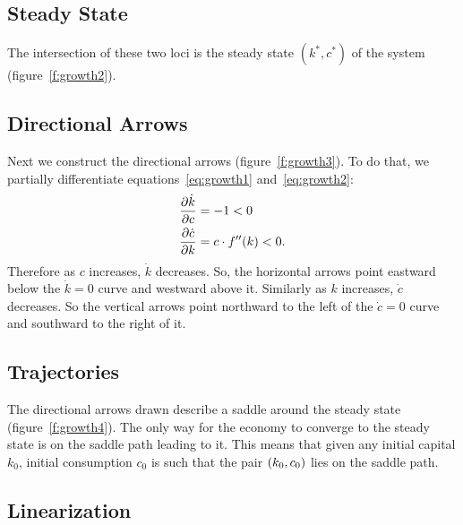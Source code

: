 \documentclass[letterpaper,12pt,leqno]{article}
\begin{document}
\subsection{Steady State}

The intersection of these two loci is the steady state $(k^{*},c^{*})$ of the system (figure~\ref{f:growth2}).

\subsection{Directional Arrows}

Next we construct the directional arrows (figure~\ref{f:growth3}). To do that, we partially differentiate equations~\eqref{eq:growth1} and~\eqref{eq:growth2}: 
\begin{align*}
\frac{\partial \dot{k}}{\partial c} &=-1<0 \\
\frac{\partial \dot{c}}{\partial k} &=c\cdot f''(k)<0.
\end{align*}
Therefore as $c$ increases, $\dot{k}$ decreases. So, the horizontal arrows point eastward below the $\dot{k}=0$ curve and westward above it. Similarly as $k$ increases, $\dot{c}$ decreases. So the vertical arrows point northward to the left of the $\dot{c}=0$ curve and southward to the right of it.

\subsection{Trajectories}

The directional arrows drawn describe a saddle around the steady state (figure~\ref{f:growth4}). The only way for the economy to converge to the steady state is on the saddle path leading to it. This means that given any initial capital $k_{0}$, initial consumption $c_{0}$ is such that the pair $\left( k_{0},c_{0} \right) $ lies on the saddle path.

\subsection{Linearization}
\end{document}
